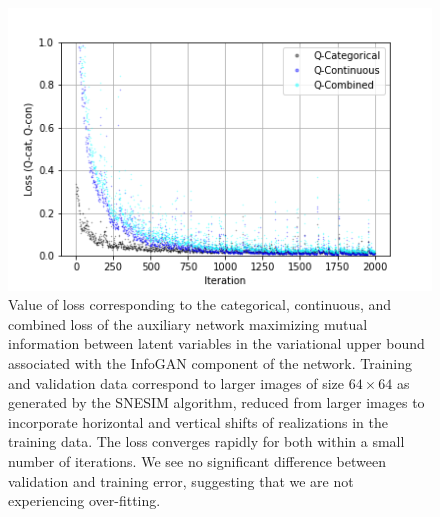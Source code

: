 \documentclass{article}
\begin{document}
\begin{figure}[h]
\centering
  \includegraphics[width=\textwidth,scale=0.2]{figures/PlotQQData2Axes_ylim.png}
  \caption{Value of loss corresponding to the categorical, continuous, and combined loss of the auxiliary network maximizing mutual information between latent variables in the variational upper bound associated with the InfoGAN component of the network. Training and validation data correspond to larger images of size $64 \times 64$ as generated by the SNESIM algorithm, reduced from larger images to incorporate horizontal and vertical shifts of realizations in the training data.  The loss converges rapidly for both within a small number of iterations.  We see no significant difference between validation and training error, suggesting that we are not experiencing over-fitting.}
\end{figure}\label{GenPCA2}
\end{document}

